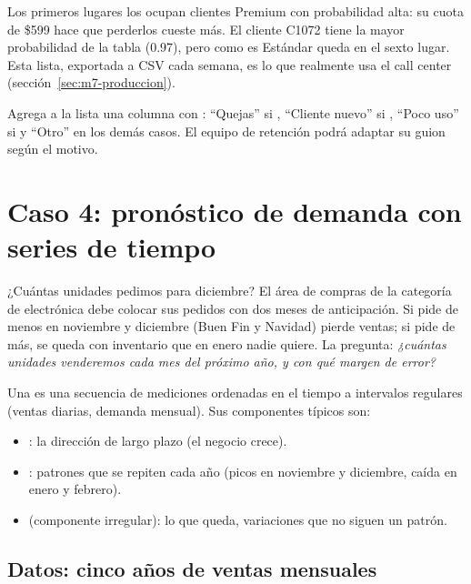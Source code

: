 Los primeros lugares los ocupan clientes Premium con probabilidad alta: su
cuota de \$599 hace que perderlos cueste más. El cliente C1072 tiene la mayor
probabilidad de la tabla (0.97), pero como es Estándar queda en el sexto lugar.
Esta lista, exportada a CSV cada semana, es lo que realmente usa el call
center (sección~\ref{sec:m7-produccion}).

\begin{hazlotu}
Agrega a la lista una columna  con
: ``Quejas'' si , ``Cliente
nuevo'' si , ``Poco uso'' si
 y ``Otro'' en los demás casos. El equipo de retención
podrá adaptar su guion según el motivo.
\end{hazlotu}

\section{Caso 4: pronóstico de demanda con series de tiempo}
\label{sec:m7-series}

\begin{ejemplo}{¿Cuántas unidades pedimos para diciembre?}
El área de compras de la categoría de electrónica debe colocar sus pedidos con
dos meses de anticipación. Si pide de menos en noviembre y diciembre (Buen Fin
y Navidad) pierde ventas; si pide de más, se queda con inventario que en enero
nadie quiere. La pregunta: \emph{¿cuántas unidades venderemos cada mes del
próximo año, y con qué margen de error?}
\end{ejemplo}

Una  es una secuencia de mediciones ordenadas en el
tiempo a intervalos regulares (ventas diarias, demanda mensual). Sus
componentes típicos son:

\begin{itemize}
  \item {}: la dirección de largo plazo (el negocio crece).
  \item {}: patrones que se repiten cada año (picos en
        noviembre y diciembre, caída en enero y febrero).
  \item {} (componente irregular): lo que queda, variaciones que
        no siguen un patrón.
\end{itemize}

\subsection{Datos: cinco años de ventas mensuales}

